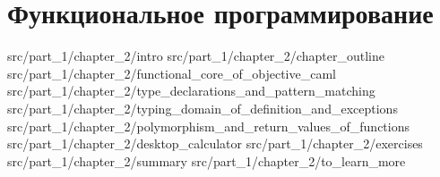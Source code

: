 \chapter{Функциональное программирование}

 {src/part_1/chapter_2/intro}
 {src/part_1/chapter_2/chapter_outline}
 {src/part_1/chapter_2/functional_core_of_objective_caml}
 {src/part_1/chapter_2/type_declarations_and_pattern_matching}
 {src/part_1/chapter_2/typing_domain_of_definition_and_exceptions}
 {src/part_1/chapter_2/polymorphism_and_return_values_of_functions}
 {src/part_1/chapter_2/desktop_calculator}
 {src/part_1/chapter_2/exercises}
 {src/part_1/chapter_2/summary}
 {src/part_1/chapter_2/to_learn_more}